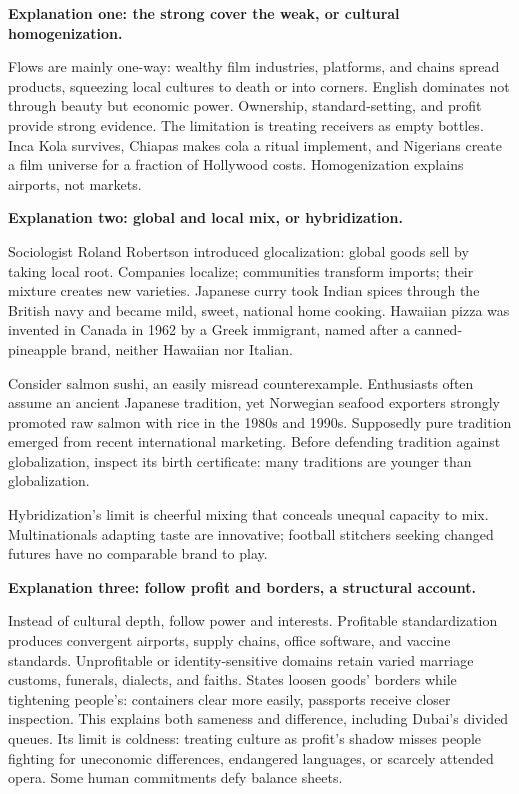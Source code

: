 \textbf{Explanation one: the strong cover the weak, or cultural homogenization.}

Flows are mainly one-way: wealthy film industries, platforms, and chains spread products, squeezing local cultures to death or into corners. English dominates not through beauty but economic power. Ownership, standard-setting, and profit provide strong evidence. The limitation is treating receivers as empty bottles. Inca Kola survives, Chiapas makes cola a ritual implement, and Nigerians create a film universe for a fraction of Hollywood costs. Homogenization explains airports, not markets.

\textbf{Explanation two: global and local mix, or hybridization.}

Sociologist Roland Robertson introduced glocalization: global goods sell by taking local root. Companies localize; communities transform imports; their mixture creates new varieties. Japanese curry took Indian spices through the British navy and became mild, sweet, national home cooking. Hawaiian pizza was invented in Canada in 1962 by a Greek immigrant, named after a canned-pineapple brand, neither Hawaiian nor Italian.

Consider salmon sushi, an easily misread counterexample. Enthusiasts often assume an ancient Japanese tradition, yet Norwegian seafood exporters strongly promoted raw salmon with rice in the 1980s and 1990s. Supposedly pure tradition emerged from recent international marketing. Before defending tradition against globalization, inspect its birth certificate: many traditions are younger than globalization.

Hybridization's limit is cheerful mixing that conceals unequal capacity to mix. Multinationals adapting taste are innovative; football stitchers seeking changed futures have no comparable brand to play.

\textbf{Explanation three: follow profit and borders, a structural account.}

Instead of cultural depth, follow power and interests. Profitable standardization produces convergent airports, supply chains, office software, and vaccine standards. Unprofitable or identity-sensitive domains retain varied marriage customs, funerals, dialects, and faiths. States loosen goods' borders while tightening people's: containers clear more easily, passports receive closer inspection. This explains both sameness and difference, including Dubai's divided queues. Its limit is coldness: treating culture as profit's shadow misses people fighting for uneconomic differences, endangered languages, or scarcely attended opera. Some human commitments defy balance sheets.

